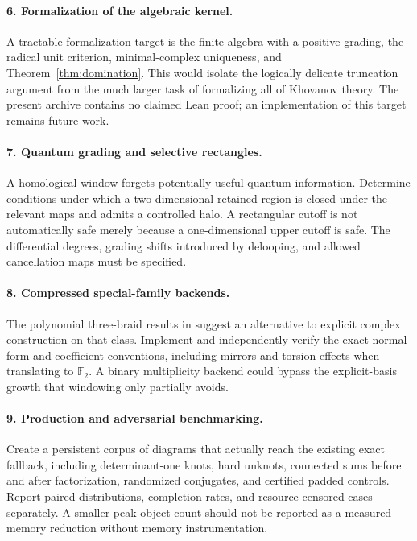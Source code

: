 \documentclass[11pt]{article}
\theoremstyle{definition}\newtheorem{definition}[theorem]{Definition}
\theoremstyle{remark}\newtheorem{remark}[theorem]{Remark}
\newcommand{\F}{\mathbb F_2}
\begin{document}
\paragraph{6. Formalization of the algebraic kernel.}
A tractable formalization target is the finite algebra with a positive grading, the radical unit criterion, minimal-complex uniqueness, and Theorem~\ref{thm:domination}. This would isolate the logically delicate truncation argument from the much larger task of formalizing all of Khovanov theory. The present archive contains no claimed Lean proof; an implementation of this target remains future work.

\paragraph{7. Quantum grading and selective rectangles.}
A homological window forgets potentially useful quantum information. Determine conditions under which a two-dimensional retained region is closed under the relevant maps and admits a controlled halo. A rectangular cutoff is not automatically safe merely because a one-dimensional upper cutoff is safe. The differential degrees, grading shifts introduced by delooping, and allowed cancellation maps must be specified.

\paragraph{8. Compressed special-family backends.}
The polynomial three-braid results in \cite{KS} suggest an alternative to explicit complex construction on that class. Implement and independently verify the exact normal-form and coefficient conventions, including mirrors and torsion effects when translating to $\F$. A binary multiplicity backend could bypass the explicit-basis growth that windowing only partially avoids.

\paragraph{9. Production and adversarial benchmarking.}
Create a persistent corpus of diagrams that actually reach the existing exact fallback, including determinant-one knots, hard unknots, connected sums before and after factorization, randomized conjugates, and certified padded controls. Report paired distributions, completion rates, and resource-censored cases separately. A smaller peak object count should not be reported as a measured memory reduction without memory instrumentation.
\end{document}
